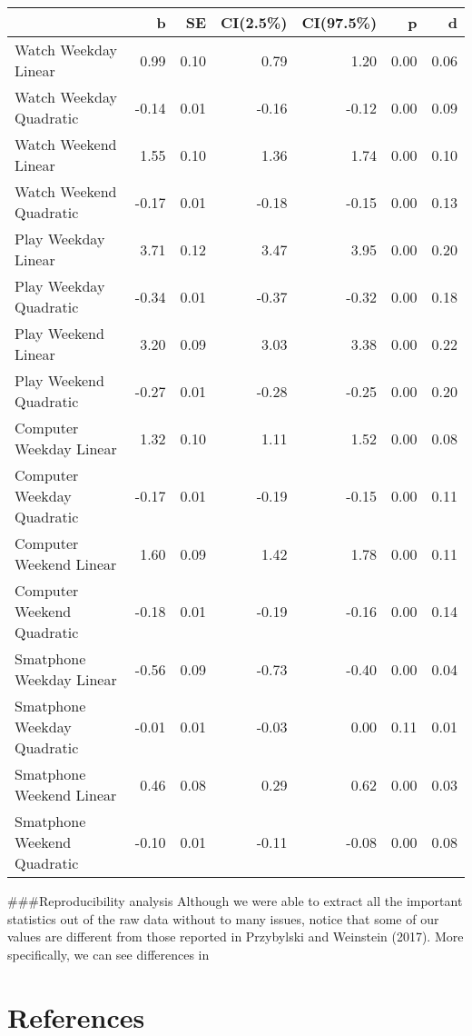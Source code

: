 \documentclass[man]{apa6}
\theoremstyle{definition}
\theoremstyle{definition}
\theoremstyle{definition}
\theoremstyle{remark}
\begin{document}
\begin{tabular}{l|r|r|r|r|r|r}
\hline
  & b & SE & CI(2.5\%) & CI(97.5\%) & p & d\\
\hline
Watch Weekday Linear & 0.99 & 0.10 & 0.79 & 1.20 & 0.00 & 0.06\\
\hline
Watch Weekday Quadratic & -0.14 & 0.01 & -0.16 & -0.12 & 0.00 & 0.09\\
\hline
Watch Weekend Linear & 1.55 & 0.10 & 1.36 & 1.74 & 0.00 & 0.10\\
\hline
Watch Weekend Quadratic & -0.17 & 0.01 & -0.18 & -0.15 & 0.00 & 0.13\\
\hline
Play Weekday Linear & 3.71 & 0.12 & 3.47 & 3.95 & 0.00 & 0.20\\
\hline
Play Weekday Quadratic & -0.34 & 0.01 & -0.37 & -0.32 & 0.00 & 0.18\\
\hline
Play Weekend Linear & 3.20 & 0.09 & 3.03 & 3.38 & 0.00 & 0.22\\
\hline
Play Weekend Quadratic & -0.27 & 0.01 & -0.28 & -0.25 & 0.00 & 0.20\\
\hline
Computer Weekday Linear & 1.32 & 0.10 & 1.11 & 1.52 & 0.00 & 0.08\\
\hline
Computer Weekday Quadratic & -0.17 & 0.01 & -0.19 & -0.15 & 0.00 & 0.11\\
\hline
Computer Weekend Linear & 1.60 & 0.09 & 1.42 & 1.78 & 0.00 & 0.11\\
\hline
Computer Weekend Quadratic & -0.18 & 0.01 & -0.19 & -0.16 & 0.00 & 0.14\\
\hline
Smatphone Weekday Linear & -0.56 & 0.09 & -0.73 & -0.40 & 0.00 & 0.04\\
\hline
Smatphone Weekday Quadratic & -0.01 & 0.01 & -0.03 & 0.00 & 0.11 & 0.01\\
\hline
Smatphone Weekend Linear & 0.46 & 0.08 & 0.29 & 0.62 & 0.00 & 0.03\\
\hline
Smatphone Weekend Quadratic & -0.10 & 0.01 & -0.11 & -0.08 & 0.00 & 0.08\\
\hline
\end{tabular}

\#\#\#Reproducibility analysis Although we were able to extract all the
important statistics out of the raw data without to many issues, notice
that some of our values are different from those reported in Przybylski
and Weinstein (2017). More specifically, we can see differences in

\newpage

\hypertarget{references}{%
\section{References}\label{references}}

\begingroup
\setlength{\parindent}{-0.5in}
\setlength{\leftskip}{0.5in}

\hypertarget{refs}{}

\endgroup
\end{document}
